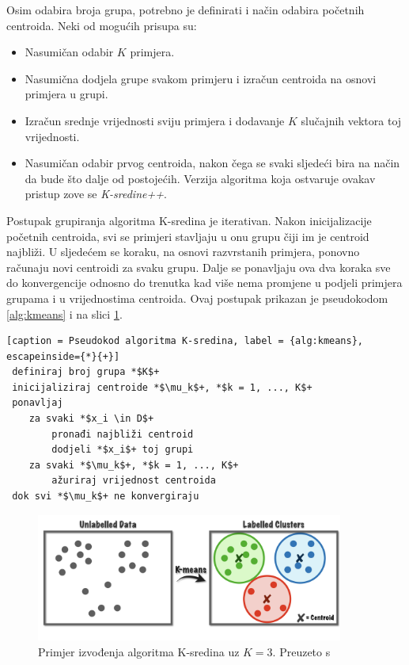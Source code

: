 \documentclass[utf8, diplomski, numeric]{fer}
\begin{document}
Osim odabira broja grupa, potrebno je definirati i način odabira početnih centroida. Neki od mogućih prisupa su:
\begin{itemize}
\item Nasumičan odabir $K$ primjera.
\item Nasumična dodjela grupe svakom primjeru i izračun centroida na osnovi primjera u grupi.
\item Izračun srednje vrijednosti sviju primjera i dodavanje $K$ slučajnih vektora toj vrijednosti.
\item Nasumičan odabir prvog centroida, nakon čega se svaki sljedeći bira na način da bude što dalje od postojećih. Verzija algoritma koja ostvaruje ovakav pristup zove se \textit{K-sredine++}.

\end{itemize}

Postupak grupiranja algoritma K-sredina je iterativan. Nakon inicijalizacije početnih centroida, svi se primjeri stavljaju u onu grupu čiji im je centroid najbliži. U sljedećem se koraku, na osnovi razvrstanih primjera, ponovno računaju novi centroidi za svaku grupu. Dalje se ponavljaju ova dva koraka sve do konvergencije odnosno do trenutka kad više nema promjene u podjeli primjera grupama i u vrijednostima centroida. Ovaj postupak prikazan je pseudokodom \ref{alg:kmeans} i na slici \ref{fig:kmeans}.

 \begin{lstlisting}[caption = Pseudokod algoritma K-sredina, label = {alg:kmeans}, escapeinside={*}{+}]
 definiraj broj grupa *$K$+
 inicijaliziraj centroide *$\mu_k$+, *$k = 1, ..., K$+
 ponavljaj
 	za svaki *$x_i \in D$+
 		pronađi najbliži centroid
 		dodjeli *$x_i$+ toj grupi
	za svaki *$\mu_k$+, *$k = 1, ..., K$+
		ažuriraj vrijednost centroida
 dok svi *$\mu_k$+ ne konvergiraju
\end{lstlisting}

\begin{figure}
\includegraphics[width=0.9\textwidth]{images/kmeans.png}
\centering
\caption{Primjer izvođenja algoritma K-sredina uz $K = 3$. Preuzeto s  \cite{kMeansUsingPython}}
\label{fig:kmeans}
\end{figure}
\end{document}
